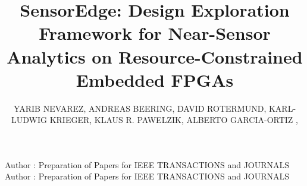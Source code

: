 \title {SensorEdge: Design Exploration Framework for Near-Sensor Analytics on Resource-Constrained Embedded FPGAs}

\author{
	\uppercase{Yarib Nevarez},
	\uppercase{Andreas Beering},	
	\uppercase{David Rotermund},
	\uppercase{Karl-Ludwig Krieger},
	\uppercase{Klaus R. Pawelzik},
	\uppercase{Alberto Garcia-Ortiz} ,
}

\address[1]{Institute of Electrodynamics and Microelectronics, University of Bremen, Bremen 28359, Germany (e-mail: nevarez@item.uni-bremen.de)}

\address[2]{Institute of Electrodynamics and Microelectronics, University of Bremen, Bremen 28359, Germany (e-mail: beering@item.uni-bremen.de)}

\address[3]{Institute for Theoretical Physics, University of Bremen, Bremen 28359, Germany (e-mail: davrot@neuro.uni-bremen.de)}

\address[4]{Institute of Electrodynamics and Microelectronics, University of Bremen, Bremen 28359, Germany (e-mail: krieger@uni-bremen.de)}

\address[5]{Institute for Theoretical Physics, University of Bremen, Bremen 28359, Germany (e-mail: pawelzik@neuro.uni-bremen.de)}

\address[6]{Institute of Electrodynamics and Microelectronics, University of Bremen, Bremen 28359, Germany (e-mail: agarcia@item.uni-bremen.de)}


\markboth
{Author \headeretal: Preparation of Papers for IEEE TRANSACTIONS and JOURNALS}
{Author \headeretal: Preparation of Papers for IEEE TRANSACTIONS and JOURNALS}


